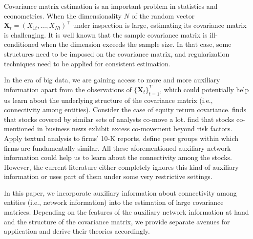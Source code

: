 Covariance matrix estimation is an important problem in statistics
and econometrics. When the dimensionality $N$ of the random vector $\boldsymbol{X}_t=(X_{1t},\dots,X_{Nt})^{\intercal}$ under inspection is large, estimating its covariance matrix is challenging. It is well known that the sample covariance matrix is ill-conditioned when the dimension exceeds the sample size. In that case, some structures need to be imposed on the covariance matrix, and regularization techniques need to be applied for consistent estimation. 

In the era of big data, we are gaining access to more and more auxiliary information apart from the observations of $\{\boldsymbol{X}_t\}_{t=1}^T$, which could potentially help us learn about the underlying structure of the covariance matrix (i.e., connectivity among entities). Consider the case of equity return covariance. \cite{israelsen2016does} finds that stocks covered by similar sets of analysts co-move a lot. \cite{ge2022news} find that stocks co-mentioned in business news exhibit excess co-movement beyond risk factors. Apply textual analysis to firms' 10-K reports, \cite{hoberg2016text} define peer groups within which firms are fundamentally similar. All these aforementioned auxiliary network information could help us to learn about the connectivity among the stocks. However, the current literature either completely ignores this kind of auxiliary information or uses part of them under some very restrictive settings. 

In this paper, we incorporate auxiliary information about connectivity among entities (i.e., network information) into the estimation of large covariance matrices. Depending on the features of the auxiliary network information at hand and the structure of the covariance matrix, we provide separate avenues for application and derive their theories accordingly. 

